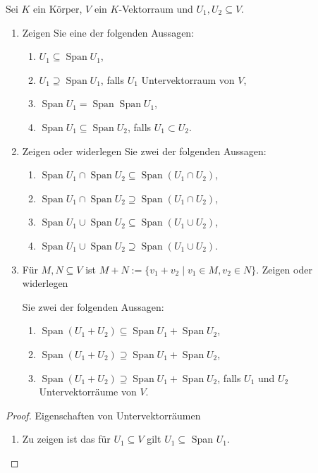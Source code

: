 \documentclass{../problemset}
\begin{document}
\pagebreak

\begin{problem}
Sei $K$ ein Körper, $V$ ein $K$-Vektorraum und $U_1, U_2 \subseteq V$.
\begin{enumerate}
	\item Zeigen Sie eine der folgenden Aussagen:
	      \begin{enumerate}[label=\alph*)]
		      \item $U_1 \subseteq \operatorname{Span} U_1$,
		      \item $U_1 \supseteq \operatorname{Span} U_1$, falls $U_1$ Untervektorraum von $V$,
		      \item $\operatorname{Span} U_1 = \operatorname{Span} \operatorname{Span} U_1$,
		      \item $\operatorname{Span} U_1 \subseteq \operatorname{Span} U_2$, falls $U_1 \subset U_2$.
	      \end{enumerate}
	\item Zeigen oder widerlegen Sie zwei der folgenden Aussagen:
	      \begin{enumerate}[label=\alph*)]
		      \item $\operatorname{Span} U_1 \cap \operatorname{Span} U_2 \subseteq \operatorname{Span}(U_1 \cap U_2)$,
		      \item $\operatorname{Span} U_1 \cap \operatorname{Span} U_2 \supseteq \operatorname{Span}(U_1 \cap U_2)$,
		      \item $\operatorname{Span} U_1 \cup \operatorname{Span} U_2 \subseteq \operatorname{Span}(U_1 \cup U_2)$,
		      \item $\operatorname{Span} U_1 \cup \operatorname{Span} U_2 \supseteq \operatorname{Span}(U_1 \cup U_2)$.
	      \end{enumerate}
	\item Für $M, N \subseteq V$ ist $M + N := \{v_1 + v_2 \mid v_1 \in M, v_2 \in N\}$. Zeigen oder widerlegen

	      Sie zwei der folgenden Aussagen:
	      \begin{enumerate}[label=\alph*)]
		      \item $\operatorname{Span}(U_1 + U_2) \subseteq \operatorname{Span} U_1 + \operatorname{Span} U_2$,
		      \item $\operatorname{Span}(U_1 + U_2) \supseteq \operatorname{Span} U_1 + \operatorname{Span} U_2$,
		      \item $\operatorname{Span}(U_1 + U_2) \supseteq \operatorname{Span} U_1 + \operatorname{Span} U_2$, falls $U_1$ und $U_2$ Untervektorräume von $V$.
	      \end{enumerate}
\end{enumerate}
\begin{proof}
	Eigenschaften von Untervektorräumen
	\begin{enumerate}
		\item Zu zeigen ist das für $U_1 \subseteq V$ gilt $U_1 \subseteq$ Span $U_1$.


\end{enumerate}
\end{proof}
\end{problem}
\end{document}
